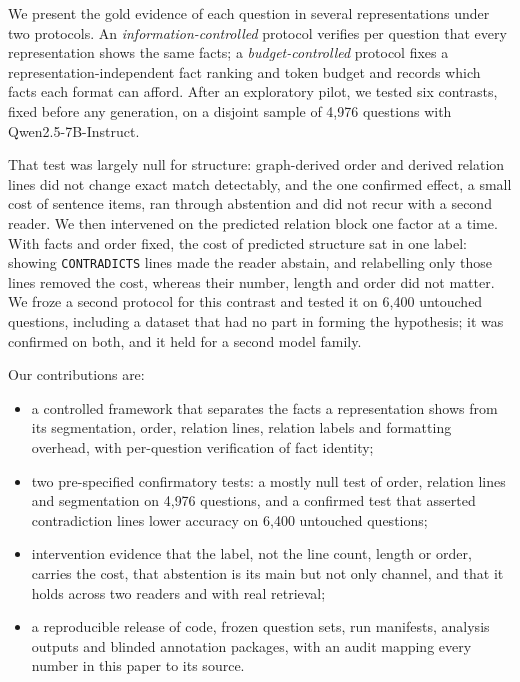 We present the gold evidence of each question in several representations under two protocols. An \emph{information-controlled} protocol verifies per question that every representation shows the same facts; a \emph{budget-controlled} protocol fixes a representation-independent fact ranking and token budget and records which facts each format can afford. After an exploratory pilot, we tested six contrasts, fixed before any generation, on a disjoint sample of 4{,}976 questions with Qwen2.5-7B-Instruct.

That test was largely null for structure: graph-derived order and derived relation lines did not change exact match detectably, and the one confirmed effect, a small cost of sentence items, ran through abstention and did not recur with a second reader. We then intervened on the predicted relation block one factor at a time. With facts and order fixed, the cost of predicted structure sat in one label: showing \texttt{CONTRADICTS} lines made the reader abstain, and relabelling only those lines removed the cost, whereas their number, length and order did not matter. We froze a second protocol for this contrast and tested it on 6{,}400 untouched questions, including a dataset that had no part in forming the hypothesis; it was confirmed on both, and it held for a second model family.

Our contributions are:
\begin{itemize}
\item a controlled framework that separates the facts a representation shows from its segmentation, order, relation lines, relation labels and formatting overhead, with per-question verification of fact identity;
\item two pre-specified confirmatory tests: a mostly null test of order, relation lines and segmentation on 4{,}976 questions, and a confirmed test that asserted contradiction lines lower accuracy on 6{,}400 untouched questions;
\item intervention evidence that the label, not the line count, length or order, carries the cost, that abstention is its main but not only channel, and that it holds across two readers and with real retrieval;
\item a reproducible release of code, frozen question sets, run manifests, analysis outputs and blinded annotation packages, with an audit mapping every number in this paper to its source.
\end{itemize}
